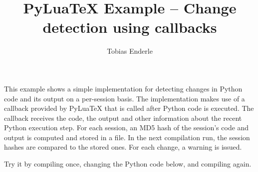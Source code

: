 \documentclass{article}
\title{PyLuaTeX Example -- Change detection using callbacks}
\author{Tobias Enderle}
\begin{document}
\maketitle

This example shows a simple implementation for detecting changes in Python code
and its output on a per-session basis.
The implementation makes use of a callback provided by PyLuaTeX that is called
after Python code is executed.
The callback receives the code, the output and other information about the
recent Python execution step.
For each session, an MD5 hash of the session's code and output is computed
and stored in a file.
In the next compilation run, the session hashes are compared to the stored ones.
For each change, a warning is issued.

Try it by compiling once, changing the Python code below, and compiling again.


\end{document}
